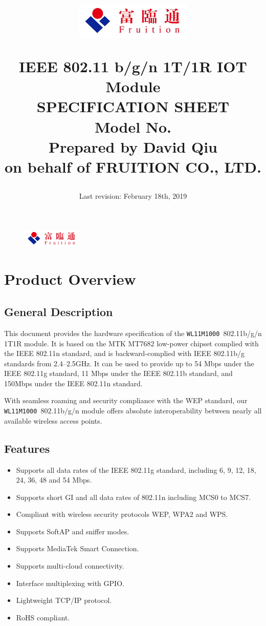 \documentclass{scrreprt}
\title{
	\begin{figure}[H]
		\centering\includegraphics[width=0.5\textwidth]{logo.jpeg}
	\end{figure}
	\vspace{1cm}
	\flushright
	IEEE 802.11 b/g/n 1T/1R IOT Module\\
	\Huge{SPECIFICATION SHEET}\\
	\vspace{2cm}
	\huge{Model No. \modelno}\\
	\vspace{2cm}
		\LARGE{Prepared by David Qiu \\ on behalf of FRUITION CO., LTD.}
}
\date{
	Last revision: February 18th, 2019\\
}
\newcommand{\pchapter}[1]{
	\begingroup\let\clearpage\relax
	\newpage
	\begin{figure}[H]
		\includegraphics[width=0.25\textwidth]{logo.jpeg}
	\end{figure}
	\chapter{#1}
	\endgroup
}
\newcommand{\modelno}{\texttt{WL11M1000}}
\begin{document}
\begin{CJK*}{UTF8}{gbsn}
\maketitle
\tableofcontents

\pchapter{Product Overview}

\section{General Description}

This document provides the hardware specification of the \modelno\ 802.11b/g/n
1T1R module.  It is based on the MTK MT7682 low-power chipset complied with the
IEEE 802.11n standard, and is backward-complied with IEEE 802.11b/g standards
from 2.4--2.5GHz. It can be used to provide up to 54 Mbps under the IEEE 802.11g
standard, 11 Mbps under the IEEE 802.11b standard, and 150Mbps under the IEEE
802.11n standard.


With seamless roaming and security compliance with the WEP standard, our
\modelno\ 802.11b/g/n module offers absolute interoperability between nearly all
available wireless access points.

\section{Features}

\begin{itemize}
\item Supports all data rates of the IEEE 802.11g standard, including 6, 9, 12,
18, 24, 36, 48 and 54 Mbps.
\item Supports short GI and all data rates of 802.11n including MCS0 to MCS7.
\item Compliant with wireless security protocols WEP, WPA2 and WPS.
\item Supports SoftAP and sniffer modes.
\item Supports MediaTek Smart Connection.
\item Supports multi-cloud connectivity.
\item Interface multiplexing with GPIO.
\item Lightweight TCP/IP protocol.
\item RoHS compliant.
\end{itemize}


\end{CJK*}
\end{document}
